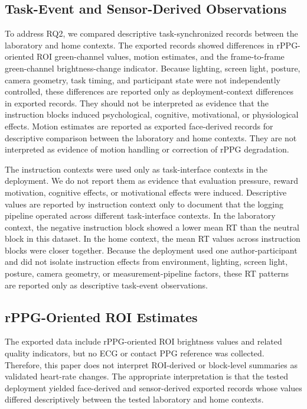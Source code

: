 \documentclass[dvipdfmx]{ehis}
\begin{document}
\subsection{Task-Event and Sensor-Derived Observations}
To address RQ2, we compared descriptive task-synchronized records between the laboratory and home contexts.
The exported records showed differences in rPPG-oriented ROI green-channel values, motion estimates, and the frame-to-frame green-channel brightness-change indicator.
Because lighting, screen light, posture, camera geometry, task timing, and participant state were not independently controlled, these differences are reported only as deployment-context differences in exported records.
They should not be interpreted as evidence that the instruction blocks induced psychological, cognitive, motivational, or physiological effects.
Motion estimates are reported as exported face-derived records for descriptive comparison between the laboratory and home contexts.
They are not interpreted as evidence of motion handling or correction of rPPG degradation.

The instruction contexts were used only as task-interface contexts in the deployment.
We do not report them as evidence that evaluation pressure, reward motivation, cognitive effects, or motivational effects were induced.
Descriptive values are reported by instruction context only to document that the logging pipeline operated across different task-interface contexts.
In the laboratory context, the negative instruction block showed a lower mean RT than the neutral block in this dataset.
In the home context, the mean RT values across instruction blocks were closer together.
Because the deployment used one author-participant and did not isolate instruction effects from environment, lighting, screen light, posture, camera geometry, or measurement-pipeline factors, these RT patterns are reported only as descriptive task-event observations.

\subsection{rPPG-Oriented ROI Estimates}
The exported data include rPPG-oriented ROI brightness values and related quality indicators, but no ECG or contact PPG reference was collected.
Therefore, this paper does not interpret ROI-derived or block-level summaries as validated heart-rate changes.
The appropriate interpretation is that the tested deployment yielded face-derived and sensor-derived exported records whose values differed descriptively between the tested laboratory and home contexts.
\end{document}
